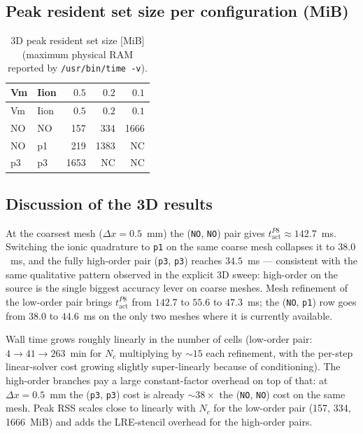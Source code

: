 \documentclass[11pt,a4paper]{article}
\newcommand{\code}[1]{\texttt{\small #1}}
\begin{document}
\subsection{Peak resident set size per configuration (MiB)}

\begin{center}\footnotesize
\begin{longtable}{llrrr}
\caption{3D peak resident set size [MiB] (maximum physical RAM
reported by \texttt{/usr/bin/time -v}).}\\
\toprule
Vm & Iion & $0.5$ & $0.2$ & $0.1$ \\
\midrule\endfirsthead\toprule
Vm & Iion & $0.5$ & $0.2$ & $0.1$ \\
\midrule\endhead
NO & NO &  157 &  334 & 1666 \\
NO & p1 &  219 & 1383 & NC   \\
p3 & p3 & 1653 & NC   & NC   \\
\bottomrule\end{longtable}\end{center}

\subsection{Discussion of the 3D results}

At the coarsest mesh ($\Delta x = 0.5$~mm) the (\code{NO}, \code{NO})
pair gives $t_{\text{act}}^{P8} \approx 142.7$~ms. Switching the ionic
quadrature to \code{p1} on the same coarse mesh collapses it to
$38.0$~ms, and the fully high-order pair (\code{p3}, \code{p3})
reaches $34.5$~ms --- consistent with the same qualitative pattern
observed in the explicit 3D sweep: high-order on the source is the
single biggest accuracy lever on coarse meshes. Mesh refinement of the
low-order pair brings $t_{\text{act}}^{P8}$ from $142.7$ to $55.6$ to
$47.3$~ms; the (\code{NO}, \code{p1}) row goes from $38.0$ to
$44.6$~ms on the only two meshes where it is currently available.

Wall time grows roughly linearly in the number of cells (low-order
pair: $4 \to 41 \to 263$~min for $N_c$ multiplying by $\sim 15$ each
refinement, with the per-step linear-solver cost growing slightly
super-linearly because of conditioning). The high-order branches pay
a large constant-factor overhead on top of that: at
$\Delta x = 0.5$~mm the (\code{p3}, \code{p3}) cost is already
$\sim 38\times$ the (\code{NO}, \code{NO}) cost on the same mesh.
Peak RSS scales close to linearly with $N_c$ for the low-order pair
(157, 334, 1666~MiB) and adds the LRE-stencil overhead for the
high-order pairs.
\end{document}
